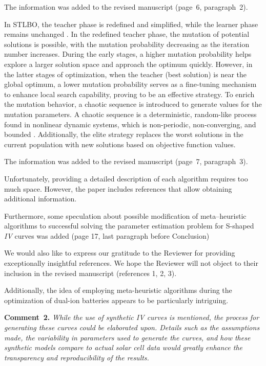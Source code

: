 \documentclass[a4paper,fleqn]{cas-sc}
\begin{document}
The information was added to the revised manuscript (page~6, paragraph~2).

In STLBO, the teacher phase is redefined and simplified, while the learner phase remains unchanged \cite{STLBO}.
In the redefined teacher phase, the mutation of potential solutions is possible,
with the mutation probability decreasing as the iteration number increases.
During the early stages, a higher mutation probability helps explore a larger solution space
and approach the optimum quickly.
However, in the latter stages of optimization, when the teacher (best solution) is near the global optimum,
a lower mutation probability serves as a fine-tuning mechanism
to enhance local search capability, proving to be an effective strategy.
To enrich the mutation behavior, a chaotic sequence is introduced to generate values for the mutation parameters.
A chaotic sequence is a deterministic, random-like process found in nonlinear dynamic systems,
which is non-periodic, non-converging, and bounded \cite{May1976}.
Additionally, the elite strategy replaces the worst solutions in the current population with new solutions based on objective function values.

The information was added to the revised manuscript (page~7, paragraph~3).

Unfortunately, providing a detailed description of each algorithm requires too much space.
However, the paper includes references that allow obtaining additional information.

Furthermore, some speculation about possible modification of meta--heuristic algorithms
to successful solving the parameter estimation problem for S-shaped \emph{IV} curves was added (page 17, last paragraph before Conclusion)

We would also like to express our gratitude to the Reviewer for providing exceptionally insightful references.
We hope the Reviewer will not object to their inclusion in the revised manuscript (references 1, 2, 3).

Additionally, the idea of employing meta-heuristic algorithms during the optimization of dual-ion batteries appears to be particularly intriguing.



\vspace{1cm}
\noindent
\textcolor[rgb]{0.00,0.50,1.00}{\textbf{Comment~2.}}
\emph{While the use of synthetic IV curves is mentioned, the process for generating
these curves could be elaborated upon.
Details such as the assumptions made, the variability in parameters used to generate the curves,
and how these synthetic models compare to actual solar cell data would greatly enhance the transparency and reproducibility of the results.}
\end{document}

